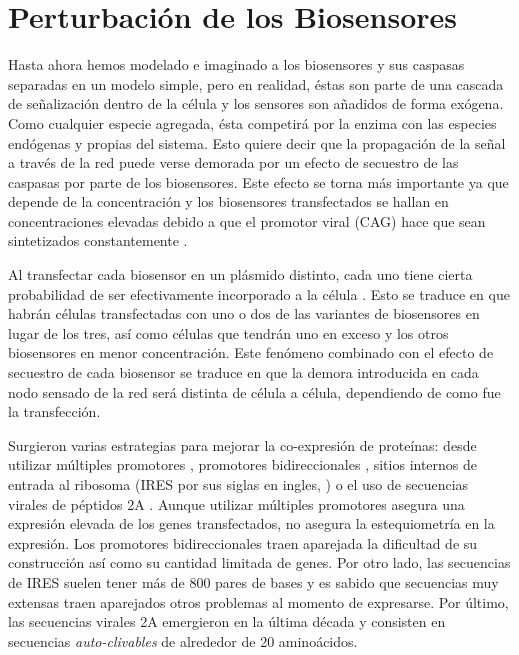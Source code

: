 \section{Perturbación de los Biosensores}


Hasta ahora hemos modelado e imaginado a los biosensores y sus caspasas separadas en un modelo simple, pero en realidad, éstas son parte de una cascada de señalización dentro de la célula y los sensores son añadidos de forma exógena. Como cualquier especie agregada, ésta competirá por la enzima con las especies endógenas y propias del sistema. Esto quiere decir que la propagación de la señal a través de la red puede verse demorada por un efecto de secuestro de las caspasas por parte de los biosensores. Este efecto se torna más importante ya que depende de la concentración y los biosensores transfectados se hallan en concentraciones elevadas debido a que el promotor viral (CAG) hace que sean sintetizados constantemente \citep{Wachsmuth2015}. 

Al transfectar cada biosensor en un plásmido distinto, cada uno tiene cierta probabilidad de ser efectivamente incorporado a la célula \citep{Schwake2010}. Esto se traduce en que habrán células transfectadas con uno o dos de las variantes de biosensores en lugar de los tres, así como células que tendrán uno en exceso y los otros biosensores en menor concentración. Este fenómeno combinado con el efecto de secuestro de cada biosensor se traduce en que la demora introducida en cada nodo sensado de la red será distinta de célula a célula, dependiendo de como fue la transfección.

Surgieron varias estrategias para mejorar la co-expresión de proteínas: desde utilizar múltiples promotores \citep{Kriz2010}, promotores bidireccionales \citep{Vogl2018}, sitios internos de entrada al ribosoma (IRES por sus siglas en ingles, \cite{Wong2002}) o el uso de secuencias virales de péptidos 2A \citep{Kim2011}. Aunque utilizar múltiples promotores asegura una expresión elevada de los genes transfectados, no asegura la estequiometría en la expresión. Los promotores bidireccionales traen aparejada la dificultad de su construcción así como su cantidad limitada de genes. Por otro lado, las secuencias de IRES suelen tener más de 800 pares de bases y es sabido que secuencias muy extensas traen aparejados otros problemas al momento de expresarse. Por último, las secuencias virales 2A emergieron en la última década y consisten en secuencias \textit{auto-clivables} de alrededor de 20 aminoácidos. 

